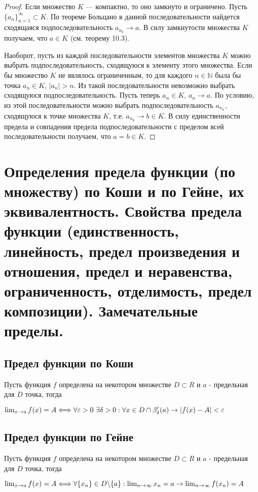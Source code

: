 \documentclass[12pt]{article}
\theoremstyle{definition}
\begin{document}
\begin{proof}
Если множество $K$ --- компактно, то оно замкнуто и ограничено.
Пусть $\{a_n\}_{n=1}^\infty\subset K$. По теореме Больцано в данной последовательности
найдется сходящаяся подпоследовательность $a_{n_k}\to a$. В силу замкнутости множества $K$
получаем, что $a\in K$ (см. теорему 10.3).

Наоборот, пусть из каждой последовательности элементов множества $K$
можно выбрать подпоследовательность, сходящуюся к элементу этого множества.
Если бы множество $K$ не являлось ограниченным, то для каждого $n\in \mathbb{N}$
была бы точка $a_n\in K$, $|a_n|>n$. Из такой последовательности невозможно выбрать
сходящуюся подпоследовательность. Пусть теперь $a_n\in K$, $a_n\to a$.
По условию, из этой последовательности можно выбрать подпоследовательность $a_{n_k}$,
сходящуюся к точке множества $K$, т.е. $a_{n_k}\to b\in K$. В силу единственности предела
и совпадения предела подпоследовательности с пределом всей последовательности получаем,
что $a=b\in K$.
\end{proof}

\section{Определения предела функции (по множеству) по Коши и по Гейне, их эквивалентность. Свойства предела функции (единственность, линейность, предел произведения и отношения, предел и неравенства, ограниченность, отделимость, предел композиции). Замечательные пределы.}
\subsection{Предел функции по Коши}
Пусть функция $f$ определена на некотором множестве $D \subset R$ и $a $ - предельная для $D$ точка, тогда
\begin{center}
$\lim_{x \to a} f(x) = A \Longleftrightarrow \\ \forall \varepsilon > 0 \ \exists \delta > 0: \forall x \in D \cap \beta'_{\delta}(a) \to |f(x) - A | < \varepsilon$
\end{center}
\subsection{Предел функции по Гейне}
Пусть функция $f$ определена на некотором множестве $D \subset R$ и $a $ - предельная для $D$ точка, тогда
\begin{center}
$\lim_{x \to a} f(x) = A \Longleftrightarrow \\ \forall \{x_n\} \in D \backslash \{a\} :\lim_{n \to \infty}x_n = a \to \lim_{n\to \infty} f(x_n) = A$
\end{center}
\end{document}
